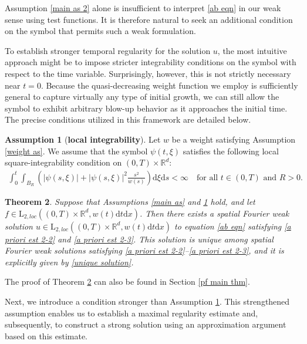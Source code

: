 \documentclass[11pt,reqno]{amsart}
\newtheorem{thm}{Theorem}[section]
\theoremstyle{definition}
\newtheorem{assumption}[thm]{Assumption}
\theoremstyle{remark}
\newcommand\bR{\mathbb{R}}
\numberwithin{equation}{section}
\begin{document}
Assumption \ref{main as 2} alone is insufficient to interpret \eqref{ab eqn} in our weak sense using test functions. 
It is therefore natural to seek an additional condition on the symbol that permits such a weak formulation. 


To establish stronger temporal regularity for the solution $u$, the most intuitive approach might be to impose stricter integrability conditions on the symbol with respect to the time variable. 
Surprisingly, however, this is not strictly necessary near $t=0$. 
Because the quasi-decreasing weight function we employ is sufficiently general to capture virtually any type of initial growth, we can still allow the symbol to exhibit arbitrary blow-up behavior as it approaches the initial time. 
The precise conditions utilized in this framework are detailed below.

\begin{assumption}[\textbf{local integrability}]
										\label{main as 3}
Let $w$ be a weight satisfying Assumption \ref{weight as}. We assume that the symbol $\psi(t,\xi)$ satisfies the following local square-integrability condition on $(0,T) \times \bR^d$:
\begin{align*}
\int_0^t \int_{B_R} \left(|\psi(s,\xi)|+|\psi(s,\xi)|^2 \frac{s^2}{w(s)} \right)\mathrm{d}\xi \mathrm{d}s < \infty \quad \text{for all } t \in (0,T) \text{ and } R > 0.
\end{align*}
\end{assumption}


\begin{thm}
							\label{main thm 2}
Suppose that Assumptions \ref{main as} and \ref{main as 3} hold, and let $f \in \mathrm{L}_{2,loc}\left( (0,T) \times \bR^d, w(t)\mathrm{d}t\mathrm{d}x \right)$. Then there exists a spatial Fourier weak solution $u \in \mathrm{L}_{2,loc}\left( (0,T) \times \bR^d, w(t)\mathrm{d}t\mathrm{d}x \right)$ to equation \eqref{ab eqn} satisfying \eqref{a priori est 2-2} and \eqref{a priori est 2-3}. 
This solution is unique among spatial Fourier weak solutions satisfying \eqref{a priori est 2-2}--\eqref{a priori est 2-3}, and it is explicitly given by \eqref{unique solution}.
\end{thm}

The proof of Theorem \ref{main thm 2} can also be found in Section \ref{pf main thm}.
\vspace{2mm}


Next, we introduce a condition stronger than Assumption \ref{main as 3}. 
This strengthened assumption enables us to establish a maximal regularity estimate and, subsequently, to construct a strong solution using an approximation argument based on this estimate.
\end{document}
